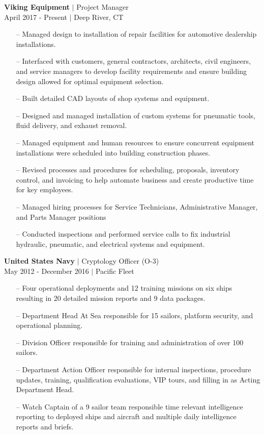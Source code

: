 
{\sc\textbf{Viking Equipment} $\vert$  Project Manager}\\
{\color{gray} April 2017 - Present $\vert$ Deep River, CT} \\
\small{
  \begin{itemize}[leftmargin=*]
  \item[--] Managed design to installation of repair facilities for automotive dealership installations. %
\item[--] Interfaced with customers, general contractors, architects, civil engineers, and service managers to develop facility requirements and ensure building design allowed for optimal equipment selection.
\item[--] Built detailed CAD layouts of shop systems and equipment.
\item[--] Designed and managed installation of custom systems for pneumatic tools, fluid delivery, and exhaust removal.
\item[--] Managed equipment and human resources to ensure concurrent equipment installations were scheduled into building construction phases.
\item[--] Revised processes and procedures for scheduling, proposals, inventory control, and invoicing to help automate business and create productive time for key employees.
\item[--] Managed hiring processes for Service Technicians, Administrative Manager, and Parts Manager positions
\item[--] Conducted inspections and performed service calls to fix industrial hydraulic, pneumatic, and electrical systems and equipment.
\end{itemize}
}

\vspace{16pt}

{\sc \textbf{United States Navy} $\vert$ Cryptology Officer (O-3)}\\
{\color{gray} May 2012 - December 2016 $\vert$ Pacific Fleet }\\

\small{
\begin{itemize}[leftmargin=*]
\item[--] Four operational deployments and 12 training missions on six ships resulting in 20 detailed mission reports and 9 data packages.
\item[--] Department Head At Sea responsible for 15 sailors, platform security, and operational planning.
\item[--] Division Officer responsible for training and administration of over 100 sailors.
\item[--] Department Action Officer responsible for internal inspections, procedure updates, training, qualification evaluations, VIP tours, and filling in as Acting Department Head.
\item[--] Watch Captain of a 9 sailor team responsible time relevant intelligence reporting to deployed ships and aircraft and multiple daily intelligence reports and briefs.
\end{itemize}
}

